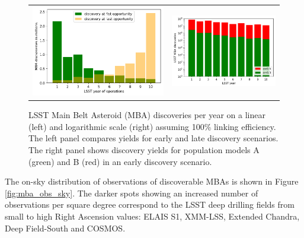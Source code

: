 \begin{figure}[tb!]
\begin{center}
\begin{tabular}{cc}
\includegraphics[width=0.5\linewidth]{figs/discovery_time.png} &
\includegraphics[width=0.5\linewidth]{figs/disc_per_yr2.png}
\end{tabular}
\end{center}
\caption{LSST Main Belt Asteroid (\gls{MBA}) discoveries per year on a linear (left) and logarithmic scale (right) assuming 100\% linking efficiency. The left panel compares yields for early and late discovery scenarios. The right panel shows discovery yields for population models A (green) and \gls{B} (red) in an early discovery scenario.}
\label{fig:mba_disc_yr}       %
\end{figure}
%
The on-sky distribution of observations of discoverable MBAs is shown in Figure \ref{fig:mba_obs_sky}. The darker spots showing an increased number of observations per square degree correspond to the \gls{LSST} deep drilling fields from small to high Right Ascension values: ELAIS S1, \gls{XMM}-LSS, Extended Chandra, Deep Field-South and COSMOS.
